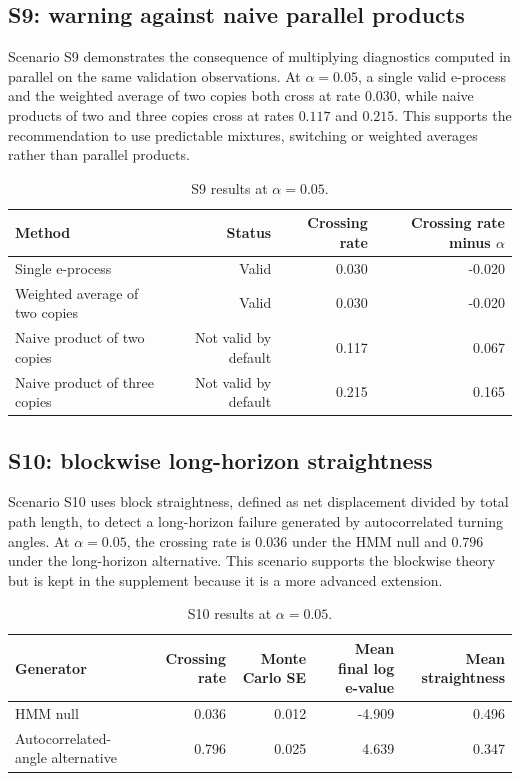 \documentclass[pdflatex,sn-basic]{sn-jnl}
\newcommand{\1}{\mathbf 1}
\begin{document}
\subsection{S9: warning against naive parallel products}

Scenario S9 demonstrates the consequence of multiplying diagnostics computed in parallel on the same validation observations. At $\alpha=0.05$, a single valid e-process and the weighted average of two copies both cross at rate $0.030$, while naive products of two and three copies cross at rates $0.117$ and $0.215$. This supports the recommendation to use predictable mixtures, switching or weighted averages rather than parallel products.

\begin{table}[h]
\centering
\footnotesize
\begin{tabular}{@{}lrrr@{}}
\toprule
Method & Status & Crossing rate & Crossing rate minus $\alpha$ \\
\midrule
Single e-process & Valid & 0.030 & -0.020 \\
Weighted average of two copies & Valid & 0.030 & -0.020 \\
Naive product of two copies & Not valid by default & 0.117 & 0.067 \\
Naive product of three copies & Not valid by default & 0.215 & 0.165 \\
\bottomrule
\end{tabular}
\caption{S9 results at $\alpha=0.05$.}
\label{tab:supp_s9}
\end{table}

\subsection{S10: blockwise long-horizon straightness}

Scenario S10 uses block straightness, defined as net displacement divided by total path length, to detect a long-horizon failure generated by autocorrelated turning angles. At $\alpha=0.05$, the crossing rate is $0.036$ under the HMM null and $0.796$ under the long-horizon alternative. This scenario supports the blockwise theory but is kept in the supplement because it is a more advanced extension.

\begin{table}[h]
\centering
\footnotesize
\begin{tabular}{@{}lrrrr@{}}
\toprule
Generator & Crossing rate & Monte Carlo SE & Mean final log e-value & Mean straightness \\
\midrule
HMM null & 0.036 & 0.012 & -4.909 & 0.496 \\
Autocorrelated-angle alternative & 0.796 & 0.025 & 4.639 & 0.347 \\
\bottomrule
\end{tabular}
\caption{S10 results at $\alpha=0.05$.}
\label{tab:supp_s10}
\end{table}
\end{document}
